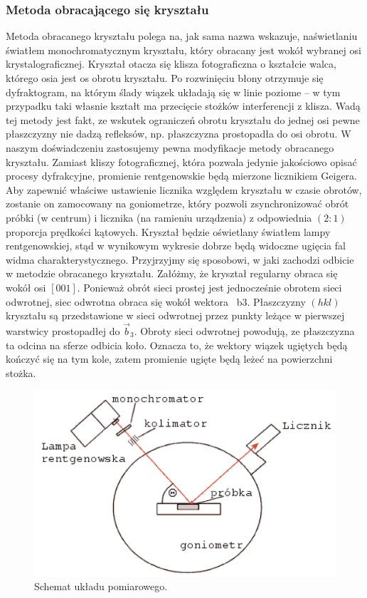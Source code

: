 \documentclass[paper=a4, fontsize=12pt]{scrartcl}
\begin{document}
\subsubsection{Metoda obracającego się kryształu}
Metoda obracanego kryształu polega na, jak sama nazwa wskazuje, naświetlaniu światłem monochromatycznym kryształu, który obracany jest wokół wybranej osi krystalograficznej. Kryształ otacza się klisza fotograficzna o kształcie walca, którego osia jest os obrotu kryształu. Po rozwinięciu błony otrzymuje się dyfraktogram, na którym ślady wiązek układają się w linie poziome – w tym przypadku taki własnie kształt
ma przecięcie stożków interferencji z klisza. Wadą tej metody jest fakt, ze wskutek ograniczeń obrotu kryształu do jednej osi pewne płaszczyzny nie dadzą refleksów, np. płaszczyzna prostopadła do osi obrotu. W naszym doświadczeniu zastosujemy pewna modyfikacje metody obracanego kryształu. Zamiast kliszy fotograficznej, która pozwala jedynie jakościowo opisać procesy dyfrakcyjne, promienie rentgenowskie będą mierzone licznikiem Geigera. Aby zapewnić
właściwe ustawienie licznika względem kryształu w czasie obrotów, zostanie on zamocowany na goniometrze, który pozwoli zsynchronizować obrót próbki (w centrum) i licznika (na ramieniu urządzenia) z odpowiednia $(2:1)$ proporcja prędkości kątowych. Kryształ będzie oświetlany światłem lampy rentgenowskiej, stąd w wynikowym wykresie dobrze będą widoczne ugięcia fal widma charakterystycznego. Przyjrzyjmy się sposobowi, w jaki zachodzi odbicie w metodzie obracanego kryształu. Załóżmy, że kryształ regularny obraca się wokół osi $[001]$. Ponieważ obrót sieci prostej jest jednocześnie obrotem sieci odwrotnej, siec odwrotna obraca się wokół wektora ~b3. Płaszczyzny $(hkl)$ kryształu są przedstawione w sieci odwrotnej przez punkty leżące w pierwszej warstwicy prostopadłej do $\vec{b}_3$. Obroty sieci odwrotnej powodują, ze płaszczyzna ta odcina na sferze odbicia koło. Oznacza to, że wektory wiązek ugiętych będą kończyć się na tym kole, zatem promienie ugięte będą leżeć na powierzchni stożka.
\begin{figure}[h!]
\centering
\includegraphics[width=0.8\linewidth]{obr}
\caption{Schemat układu pomiarowego.}
\label{fig:obr}
\end{figure}
\end{document}
